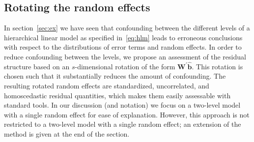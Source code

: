 \documentclass[12pt]{article} %
\newcommand{\al}[1]{{\color{red} #1}}
\begin{document}
\subsection{Rotating the random effects}\label{sec:rotate}
\noindent
In section~\ref{sec:ex} we have seen that confounding between the different levels of a hierarchical linear model as specified in~\eqref{eq:hlm} leads to erroneous conclusions with respect to the distributions of error terms and random effects. In order to reduce confounding between the levels, we propose an assessment of the residual structure based on an $s$-dimensional rotation of the form $\bm{W}^{\prime} \widehat{\bm{b}}$. This rotation is chosen such that it substantially reduces the amount of confounding. The resulting rotated random effects are standardized, uncorrelated, and homoscedastic residual quantities, which makes them easily assessable with standard tools. In our discussion (and notation) we focus on a two-level model with a single random effect for ease of explanation. However, this approach is not restricted to a two-level model with a single random effect; an extension of the method is given at the end of the section.

%
%
\end{document}
